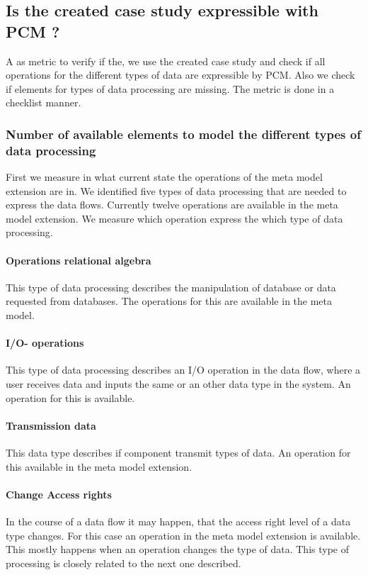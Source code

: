 \subsection{Is the created case study expressible with PCM ?}
A as metric to verify if the, we use the created case study and check if all operations for the different types of data are expressible by PCM. Also we check if elements for types of data processing are missing. The metric is done in a checklist manner. 
\subsubsection{Number of available elements to model the different types of data processing}
First we measure in what current state the operations of the meta model extension are in. We identified five types of data processing that are needed to express the data flows. Currently twelve operations are available in the meta model extension. We measure which operation express the which type of data processing.
\paragraph{Operations relational algebra}
This type of data processing describes the manipulation of database or data requested from databases. The operations for this are available in the meta model. 
\paragraph{I/O- operations}
This type of data processing describes an I/O operation in the data flow, where a user receives data and inputs the same or an other data type in the system. An operation for this is available. 
\paragraph{Transmission data}
This data type describes if component transmit types of data. An operation for this available in the meta model extension. 
\paragraph{Change Access rights}
In the course of a data flow it may happen, that the access right level of a data type changes. For this case an operation in the meta model extension is available. This mostly happens when an operation changes the type of data. This type of processing is closely related to the next one described. 
